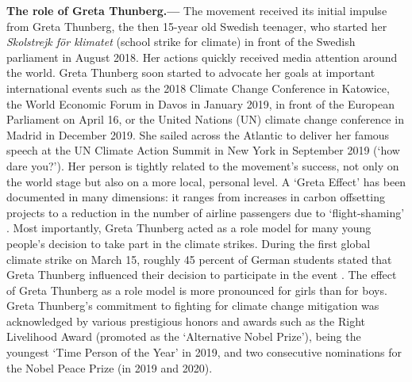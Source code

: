 \textbf{The role of Greta Thunberg.---} The movement received its initial impulse from Greta Thunberg, the then 15-year old Swedish teenager, who started her \textit{Skolstrejk för klimatet} (school strike for climate) in front of the Swedish parliament in August 2018. Her actions quickly received media attention around the world. Greta Thunberg soon started to advocate her goals at important international events such as the 2018 Climate Change Conference in Katowice, the World Economic Forum in Davos in January 2019, in front of the European Parliament on April 16, or the United Nations (UN) climate change conference in Madrid in December 2019. She sailed across the Atlantic to deliver her famous speech at the UN Climate Action Summit in New York in September 2019 (`how dare you?'). Her person is tightly related to the movement's success, not only on the world stage but also on a more local, personal level. A `Greta Effect' has been documented in many dimensions: it ranges from increases in carbon offsetting projects  \citep{guardian2019greta_effect} to a reduction in the number of airline passengers due to `flight-shaming' \citep{economist2019greta_effect}. Most importantly, Greta Thunberg acted as a role model for many young people's decision to take part in the climate strikes. During the first global climate strike on March 15, roughly 45 percent of German students stated that Greta Thunberg influenced their decision to participate in the event \citep{sommer2019fridays}. The effect of Greta Thunberg as a role model is more pronounced for girls than for boys. Greta Thunberg's commitment to fighting for climate change mitigation was acknowledged by various prestigious honors and awards such as the Right Livelihood Award (promoted as the `Alternative Nobel Prize'), being the youngest `Time Person of the Year' in 2019, and two consecutive nominations for the Nobel Peace Prize (in 2019 and 2020).



